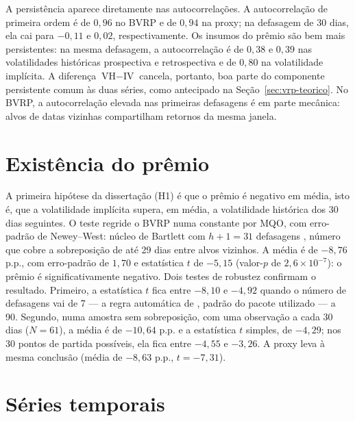 
A persistência aparece diretamente nas autocorrelações. A autocorrelação de
primeira ordem é de $0{,}96$ no BVRP e de $0{,}94$ na proxy; na defasagem de
30 dias, ela cai para $-0{,}11$ e $0{,}02$, respectivamente. Os insumos do
prêmio são bem mais persistentes: na mesma defasagem, a autocorrelação é de
$0{,}38$ e $0{,}39$ nas volatilidades históricas prospectiva e retrospectiva e
de $0{,}80$ na volatilidade implícita. A diferença $\text{VH} - \text{IV}$
cancela, portanto, boa parte do componente persistente comum às duas séries,
como antecipado na Seção~\ref{sec:vrp-teorico}. No BVRP, a autocorrelação
elevada nas primeiras defasagens é em parte mecânica: alvos de datas vizinhas
compartilham retornos da mesma janela.

\section{Existência do prêmio}
\label{sec:h1}

A primeira hipótese da dissertação (H1) é que o prêmio é negativo em média,
isto é, que a volatilidade implícita supera, em média, a volatilidade histórica
dos 30 dias seguintes. O teste regride o BVRP numa constante por MQO, com
erro-padrão de Newey--West: núcleo de Bartlett com $h+1 = 31$ defasagens
\citep{newey1987simple}, número que cobre a sobreposição de até 29 dias entre
alvos vizinhos. A média é de $-8{,}76$ p.p., com erro-padrão de $1{,}70$ e
estatística $t$ de $-5{,}15$ (valor-$p$ de $2{,}6 \times 10^{-7}$): o prêmio é
significativamente negativo. Dois testes de robustez confirmam o resultado.
Primeiro, a estatística $t$ fica entre $-8{,}10$ e $-4{,}92$ quando o número de
defasagens vai de 7 --- a regra automática de \citet{newey1994automatic},
padrão do pacote utilizado --- a 90. Segundo, numa amostra sem sobreposição,
com uma observação a cada 30 dias ($N = 61$), a média é de $-10{,}64$ p.p. e a
estatística $t$ simples, de $-4{,}29$; nos 30 pontos de partida possíveis, ela
fica entre $-4{,}55$ e $-3{,}26$. A proxy leva à mesma conclusão (média de
$-8{,}63$ p.p., $t = -7{,}31$).

\section{Séries temporais}
\label{sec:series_temporais}

